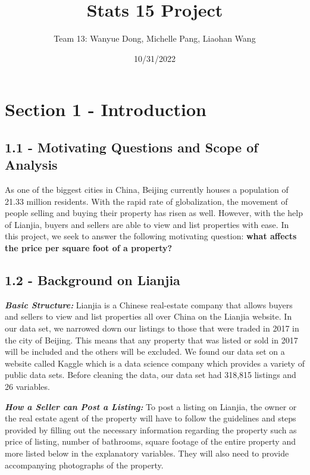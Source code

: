 \documentclass[
]{article}
\title{Stats 15 Project}
\author{Team 13: Wanyue Dong, Michelle Pang, Liaohan Wang}
\date{10/31/2022}
\begin{document}
\maketitle

\hypertarget{section-1---introduction}{%
\section{\texorpdfstring{\textbf{Section 1 -
Introduction}}{Section 1 - Introduction}}\label{section-1---introduction}}

\hypertarget{motivating-questions-and-scope-of-analysis}{%
\subsection{\texorpdfstring{\textbf{1.1 - Motivating Questions and Scope
of
Analysis}}{1.1 - Motivating Questions and Scope of Analysis}}\label{motivating-questions-and-scope-of-analysis}}

As one of the biggest cities in China, Beijing currently houses a
population of 21.33 million residents. With the rapid rate of
globalization, the movement of people selling and buying their property
has risen as well. However, with the help of Lianjia, buyers and sellers
are able to view and list properties with ease. In this project, we seek
to answer the following motivating question: \textbf{what affects the
price per square foot of a property?}

\hypertarget{background-on-lianjia}{%
\subsection{\texorpdfstring{\textbf{1.2 - Background on
Lianjia}}{1.2 - Background on Lianjia}}\label{background-on-lianjia}}

\textbf{\emph{Basic Structure:}} Lianjia is a Chinese real-estate
company that allows buyers and sellers to view and list properties all
over China on the Lianjia website. In our data set, we narrowed down our
listings to those that were traded in 2017 in the city of Beijing. This
means that any property that was listed or sold in 2017 will be included
and the others will be excluded. We found our data set on a website
called Kaggle which is a data science company which provides a variety
of public data sets. Before cleaning the data, our data set had 318,815
listings and 26 variables.

\textbf{\emph{How a Seller can Post a Listing:}} To post a listing on
Lianjia, the owner or the real estate agent of the property will have to
follow the guidelines and steps provided by filling out the necessary
information regarding the property such as price of listing, number of
bathrooms, square footage of the entire property and more listed below
in the explanatory variables. They will also need to provide
accompanying photographs of the property.
\end{document}
